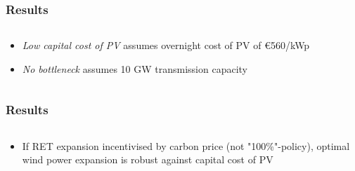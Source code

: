 \documentclass[aspectratio=1610, xcolor=dvipsnames]{beamer}
\begin{document}
    \begin{frame}
        \frametitle{Results}

        \begin{columns}[T]
            \begin{column}{5.4 cm}
                \bigskip
                \begin{itemize}
                    \item \emph{Low capital cost of PV} assumes overnight cost of PV of \euro 560/kWp
                    \item \emph{No bottleneck} assumes 10 GW transmission capacity
                \end{itemize}
            \end{column}
        \end{columns}
    \end{frame}

    \begin{frame}
        \frametitle{Results}
        \begin{columns}[T]
            \begin{column}{5.0 cm}
                \bigskip
                \begin{itemize}
                    \item If RET expansion incentivised by carbon price (not "100\%"-policy), optimal wind power expansion is
                    robust against capital cost of PV
                \end{itemize}
            \end{column}
        \end{columns}
    \end{frame}
\end{document}
